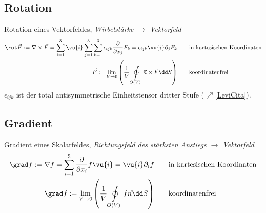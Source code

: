   \subsection{Rotation}
	  Rotation eines Vektorfeldes, \textit{Wirbelstärke $\to$ Vektorfeld}
	  \begin{equation}
		  \begin{split}
			  \rot\vec{F}:= \nabla \times \vec{F}= \sum_{i=1}^{3}\vu{i}\sum_{j=1}^{3}\sum
			  _{k=1}^{3} \epsilon_{ijk}\frac{\partial}{\partial x_{j}}F_{k} = \epsilon_{ijk}
			  \vu{i}\partial_{j} F_{k}&\qquad \text{in kartesischen Koordinaten}\\ \vec{F}
			  := \lim_{V \to 0}\left( \frac{1}{V}\oint\limits_{O(V)}\vec{n}\times \vec{F}
			  \dd S\right)&\qquad\text{koordinatenfrei}
		  \end{split}
	  \end{equation}
	  $\epsilon_{ijk}$ ist der total antisymmetrische Einheitstensor dritter Stufe ($\nearrow$\ref{LeviCita}).
  \subsection{Gradient}
	  Gradient eines Skalarfeldes, \textit{Richtungsfeld des stärksten Anstiegs
		  $\to$ Vektorfeld}
	  \begin{equation}
		  \begin{split}
			  \grad f := \nabla f = \sum_{i=1}^{3} \frac{\partial}{\partial x_{i}}f \vu{i}
			  = \vu{i}\partial_{i} f&\qquad \text{in kartesischen Koordinaten}\\ \grad f
			  := \lim_{V \to 0}\left( \frac{1}{V}\oint\limits_{O(V)}f \vec{n}\dd S\right)
			  &\qquad\text{koordinatenfrei}
		  \end{split}
	  \end{equation}
